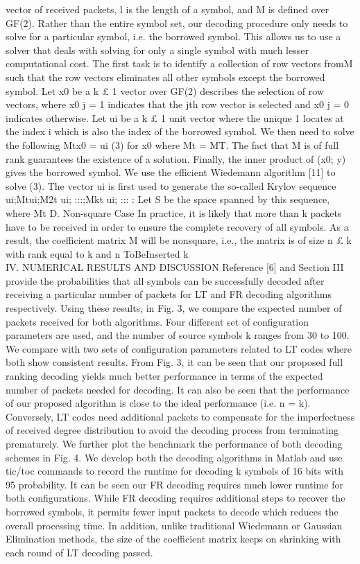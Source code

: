 \documentclass[12pt,a4paper,titlepage,twocolumn]{article}
\begin{document}
vector of received packets, l is the length of a symbol, and M
is defined over GF(2).
Rather than the entire symbol set, our decoding procedure
only needs to solve for a particular symbol, i.e. the borrowed
symbol. This allows us to use a solver that deals with solving
for only a single symbol with much lesser computational cost.
The first task is to identify a collection of row vectors fromM
such that the row vectors eliminates all other symbols except
the borrowed symbol. Let x0 be a k £ 1 vector over GF(2)
describes the selection of row vectors, where x0
j = 1 indicates
that the jth row vector is selected and x0
j = 0 indicates
otherwise. Let ui be a k £ 1 unit vector where the unique 1
locates at the index i which is also the index of the borrowed
symbol. We then need to solve the following
Mtx0 = ui (3)
for x0 where Mt = MT. The fact that M is of full rank
guarantees the existence of a solution. Finally, the inner
product of (x0; y) gives the borrowed symbol. We use the
efficient Wiedemann algorithm [11] to solve (3). The vector
ui is first used to generate the so-called Krylov sequence
ui;Mtui;M2t
ui; :::;Mkt
ui; ::: :
Let S be the space spanned by this sequence, where Mt  D. Non-square Case
In practice, it is likely that more than k packets have to
be received in order to ensure the complete recovery of all
symbols. As a result, the coefficient matrix M will be nonsquare,
i.e., the matrix is of size n £ k with rank equal to k
and n ToBeInserted k\\
IV. NUMERICAL RESULTS AND DISCUSSION
Reference [6] and Section III provide the probabilities
that all symbols can be successfully decoded after receiving
a particular number of packets for LT and FR decoding
algorithms respectively. Using these results, in Fig. 3, we
compare the expected number of packets received for both
algorithms. Four different set of configuration parameters are
used, and the number of source symbols k ranges from 30 to
100. We compare with two sets of configuration parameters
related to LT codes where both show consistent results.
From Fig. 3, it can be seen that our proposed full ranking
decoding yields much better performance in terms of the
expected number of packets needed for decoding. It can also be
seen that the performance of our proposed algorithm is close
to the ideal performance (i.e. n = k). Conversely, LT codes
need additional packets to compensate for the imperfectness
of received degree distribution to avoid the decoding process
from terminating prematurely. We further plot the benchmark the performance of both
decoding schemes in Fig. 4. We develop both the decoding
algorithms in Matlab and use tic/toc commands to record the
runtime for decoding k symbols of 16 bits with 95%
probability. It can be seen our FR decoding requires much
lower runtime for both configurations. While FR decoding
requires additional steps to recover the borrowed symbols, it
permits fewer input packets to decode which reduces the overall
processing time. In addition, unlike traditional Wiedemann
or Gaussian Elimination methods, the size of the coefficient
matrix keeps on shrinking with each round of LT decoding
passed.
\end{document}
